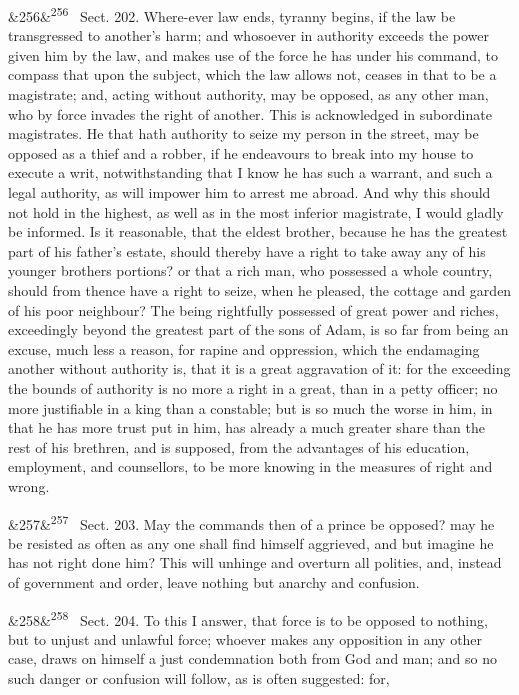 \documentclass[12pt]{article}
\newcommand{\para}[1][]{\par\noindent\ifx&#1&\else\textsuperscript{\footnotesize #1}~\fi}
\begin{document}
\para[256] Sect. 202. Where-ever law ends, tyranny begins, if the law be transgressed to another's harm; and whosoever in authority exceeds the power given him by the law, and makes use of the force he has under his command, to compass that upon the subject, which the law allows not, ceases in that to be a magistrate; and, acting without authority, may be opposed, as any other man, who by force invades the right of another. This is acknowledged in subordinate magistrates. He that hath authority to seize my person in the street, may be opposed as a thief and a robber, if he endeavours to break into my house to execute a writ, notwithstanding that I know he has such a warrant, and such a legal authority, as will impower him to arrest me abroad. And why this should not hold in the highest, as well as in the most inferior magistrate, I would gladly be informed. Is it reasonable, that the eldest brother, because he has the greatest part of his father's estate, should thereby have a right to take away any of his younger brothers portions? or that a rich man, who possessed a whole country, should from thence have a right to seize, when he pleased, the cottage and garden of his poor neighbour? The being rightfully possessed of great power and riches, exceedingly beyond the greatest part of the sons of Adam, is so far from being an excuse, much less a reason, for rapine and oppression, which the endamaging another without authority is, that it is a great aggravation of it: for the exceeding the bounds of authority is no more a right in a great, than in a petty officer; no more justifiable in a king than a constable; but is so much the worse in him, in that he has more trust put in him, has already a much greater share than the rest of his brethren, and is supposed, from the advantages of his education, employment, and counsellors, to be more knowing in the measures of right and wrong.

\para[257] Sect. 203. May the commands then of a prince be opposed? may he be resisted as often as any one shall find himself aggrieved, and but imagine he has not right done him? This will unhinge and overturn all polities, and, instead of government and order, leave nothing but anarchy and confusion.

\para[258] Sect. 204. To this I answer, that force is to be opposed to nothing, but to unjust and unlawful force; whoever makes any opposition in any other case, draws on himself a just condemnation both from God and man; and so no such danger or confusion will follow, as is often suggested: for,
\end{document}
